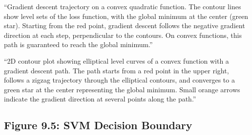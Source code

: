 \documentclass[12pt]{article}
\begin{document}
\begin{description}[style=nextline, leftmargin=0pt]
    \item[Caption Text]
    ``Gradient descent trajectory on a convex quadratic function. The contour lines show level sets of the loss function, with the global minimum at the center (green star). Starting from the red point, gradient descent follows the negative gradient direction at each step, perpendicular to the contours. On convex functions, this path is guaranteed to reach the global minimum.''

    \item[Alt-Text for Accessibility]
    ``2D contour plot showing elliptical level curves of a convex function with a gradient descent path. The path starts from a red point in the upper right, follows a zigzag trajectory through the elliptical contours, and converges to a green star at the center representing the global minimum. Small orange arrows indicate the gradient direction at several points along the path.''
\end{description}

\newpage

\subsection{Figure 9.5: SVM Decision Boundary}
\end{document}
